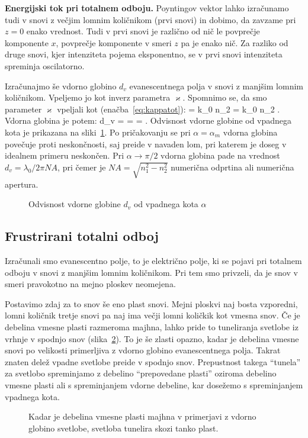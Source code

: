 \begin{example}{\bf Energijski tok pri totalnem odboju.}
Poyntingov vektor lahko izračunamo tudi v snovi z večjim lomnim količnikom (prvi snovi) in dobimo,
da zavzame pri $z=0$ enako vrednost. Tudi v prvi snovi je
različno od nič le povprečje komponente $x$, povprečje komponente v smeri $z$ pa je enako nič. Za razliko
od druge snovi, kjer intenziteta pojema eksponentno, se v prvi snovi intenziteta spreminja oscilatorno. 
\end{example}

Izračunajmo še vdorno globino $d_v$ evanescentnega polja v snovi z manjšim lomnim količnikom. Vpeljemo jo kot inverz 
parametra $\varkappa$. Spomnimo se, da smo parameter $\varkappa$ vpeljali kot (enačba~\ref{eq:kappatot}):
\beq
\varkappa = k_0 n_2 \kappa = k_0 n_2 .
\label{eq:04_81}
\eeq
Vdorna globina je potem:
\beq
d_v =  = =
.
\label{eq:04_82}
\eeq
Odvisnost vdorne globine od vpadnega kota je prikazana na sliki~\ref{fig:04_vdorna}. Po pričakovanju
se pri $\alpha = \alpha_m$ vdorna globina povečuje proti neskončnosti, saj preide v navaden lom, pri katerem
je doseg v idealnem primeru neskončen. Pri $\alpha \to \pi/2$ vdorna
globina pade na vrednost $d_v = \lambda_0/2\pi NA$, pri čemer je $NA = \sqrt{n_1^2-n_2^2}$ numerična odprtina
ali numerična apertura.
\begin{figure}[ht]
\centering
\def\svgwidth{80truemm} 

\caption{Odvisnost vdorne globine $d_v$ od vpadnega kota $\alpha$}
\label{fig:04_vdorna}
\end{figure}

\subsection*{Frustrirani totalni odboj}
Izračunali smo evanescentno polje, to je električno polje, ki se pojavi pri totalnem odboju
v snovi z manjšim lomnim količnikom. Pri tem smo privzeli, da je snov v smeri pravokotno
na mejno ploskev neomejena. 

Postavimo zdaj za to snov še eno plast snovi. Mejni ploskvi naj bosta vzporedni, lomni 
količnik tretje snovi pa naj ima večji lomni količkik kot vmesna snov. Če je debelina
vmesne plasti razmeroma majhna, lahko pride to tuneliranja svetlobe iz vrhnje v spodnjo snov
(slika~\ref{fig:04_tunel}). To je še zlasti opazno, kadar je debelina vmesne snovi po 
velikosti primerljiva z vdorno globino evanescentnega polja. Takrat
znaten delež vpadne svetlobe preide v spodnjo snov. Prepustnost takega ``tunela'' za svetlobo 
spreminjamo z debelino ``prepovedane plasti'' oziroma debelino vmesne plasti ali s
spreminjanjem vdorne debeline, kar dosežemo s spreminjanjem vpadnega kota.
\begin{figure}[ht]
\centering
\def\svgwidth{60truemm} 

\caption{Kadar je debelina vmesne plasti majhna v primerjavi z vdorno globino svetlobe, 
svetloba tunelira skozi tanko plast. }
\label{fig:04_tunel}
\end{figure}

